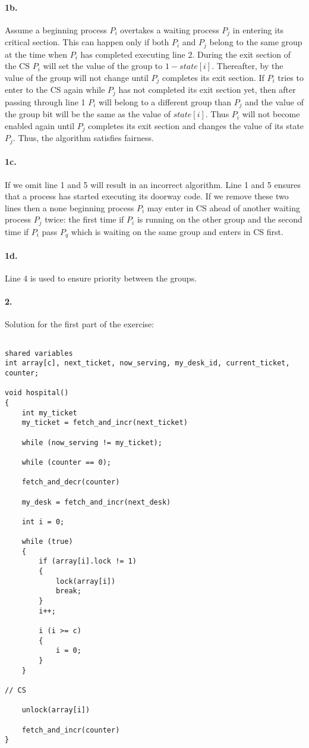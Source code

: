 \paragraph{1b.}
Assume a beginning process $P_i$ overtakes a waiting process $P_j$ in
entering its critical section.  This can happen only if both $P_i$ and
$P_j$ belong to the same group at the time when $P_i$ has completed
executing line 2.  During the exit section of the CS $P_i$ will set
the value of the group to $1 - state[i]$.  Thereafter, by the
value of the group will not change until $P_j$ completes its exit
section.  If $P_i$ tries to enter to the CS again while $P_j$ has not
completed its exit section yet, then after passing through line 1
$P_i$ will belong to a different group than $P_j$ and the value of the
group bit will be the same as the value of $state[i]$. Thus $P_i$ will
not become enabled again until $P_j$ completes its exit section and
changes the value of its state $P_j$. Thus, the algorithm satisfies
fairness.

\paragraph{1c.}
If we omit line 1 and 5 will result in an incorrect algorithm. Line 1
and 5 ensures that a process has started executing its doorway code.
If we remove these two lines then a none beginning process $P_i$ may
enter in CS ahead of another waiting process $P_j$ twice: the first
time if $P_i$ is running on the other group and the second time if
$P_i$ pass $P_q$ which is waiting on the same group and enters in CS
first.

\paragraph{1d.}
Line 4 is used to ensure priority between the groups.

\paragraph{2.}
Solution for the first part of the exercise:

\begin{lstlisting}[style=mycode]

shared variables
int array[c], next_ticket, now_serving, my_desk_id, current_ticket, counter;

void hospital()
{
	int my_ticket	
	my_ticket = fetch_and_incr(next_ticket)

	while (now_serving != my_ticket);

	while (counter == 0);

	fetch_and_decr(counter)

	my_desk = fetch_and_incr(next_desk)

	int i = 0;

	while (true)
	{
		if (array[i].lock != 1)
		{
			lock(array[i])
			break;
		}
		i++;

		i (i >= c)
		{
			i = 0;
		}
	}

// CS

	unlock(array[i])

	fetch_and_incr(counter)
}

\end{lstlisting}

